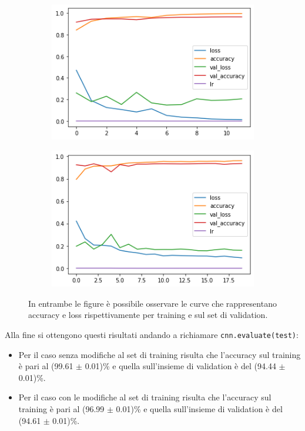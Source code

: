   \begin{figure}[H]
    \begin{subfigure}{0.55\textwidth}
      \centering
      \includegraphics[width=0.95\linewidth]{Figures/history-pneumonia-no-aug.png}
      \caption{}
      \label{fig:snap1}
    \end{subfigure}%
    \begin{subfigure}{0.55\textwidth}
      \centering
      \includegraphics[width=.95\linewidth]{Figures/history-pneumonia-aug.png}
      \caption{}
      \label{fig:snap2}
    \end{subfigure}%
    \caption{In entrambe le figure è possibile osservare le curve che rappresentano accuracy e loss rispettivamente per training e sul set di validation.}
    \label{fig:fig}
\end{figure} 
Alla fine si ottengono questi risultati andando a richiamare \lstinline{cnn.evaluate(test)}:
\begin{itemize}
  \item Per il caso senza modifiche al set di training risulta che l'accuracy sul training è pari al (99.61 $\pm$ 0.01)\% e quella sull'insieme di validation è del (94.44 $\pm$ 0.01)\%.
  \item  Per il caso con le modifiche al set di training risulta che l'accuracy sul training è pari al (96.99 $\pm$ 0.01)\% e quella sull'insieme di validation è del (94.61 $\pm$ 0.01)\%.
  
\end{itemize}


